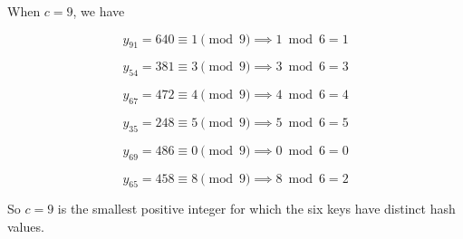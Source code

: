\begin{parts}
\begin{solution}
When $c = 9$, we have

$$y_{91} = 640 \equiv 1 \pmod 9 \implies 1 \bmod 6 = 1$$

$$y_{54} = 381 \equiv 3 \pmod 9 \implies 3 \bmod 6 = 3$$

$$y_{67} = 472 \equiv 4 \pmod 9 \implies 4 \bmod 6 = 4$$

$$y_{35} = 248 \equiv 5 \pmod 9 \implies 5 \bmod 6 = 5$$

$$y_{69} = 486 \equiv 0 \pmod 9 \implies 0 \bmod 6 = 0$$

$$y_{65} = 458 \equiv 8 \pmod 9 \implies 8 \bmod 6 = 2$$

So $c = 9$ is the smallest positive integer for which the six keys have distinct hash values.

\end{solution}

\end{parts}
